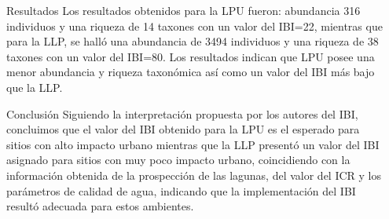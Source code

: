 \documentclass[final]{beamer}
\newlength{\sepwid}
\newlength{\onecolwid}
\begin{document}
\begin{frame}[t]
\begin{columns}[t]
\begin{column}{\onecolwid}
          
          
          \begin{block}{Resultados}
         Los resultados obtenidos para la LPU fueron: abundancia 316 individuos y una riqueza de 14 taxones con un valor del IBI=22, mientras que para la LLP, se halló una abundancia de 3494 individuos y una riqueza de 38 taxones con un valor del IBI=80. Los resultados indican que  LPU posee una menor abundancia y riqueza taxonómica así como un valor del IBI más bajo que la LLP. 
         
          \end{block}
          
          
          \begin{block}{Conclusión}
          Siguiendo la interpretación propuesta por los autores del IBI, concluimos que el valor del IBI obtenido para la LPU es el esperado para sitios con alto impacto urbano mientras que la LLP presentó un valor del IBI asignado para sitios con muy poco impacto urbano, coincidiendo con la información obtenida de la prospección de las lagunas, del valor del ICR y los parámetros de calidad de agua, indicando que  la implementación del IBI resultó adecuada para estos ambientes. 
          \end{block}
          
         \end{column}
                  
                  
                  
         \begin{column}{\sepwid}  \end{column}
         

\end{columns}
\end{frame}
\end{document}
